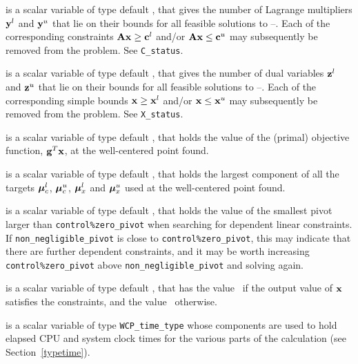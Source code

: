 \documentclass{galahad}
\newcommand{\packagename}{WCP}
\begin{document}
\begin{description}
 is a scalar variable of type default \integer, that gives the
number of Lagrange multipliers ${\mathbf{y}}^l$ and ${\mathbf{y}}^u$ that lie on their bounds 
for all feasible solutions to --. Each of the
corresponding constraints ${\mathbf{A}} {\mathbf{x}} \geq {\mathbf{c}}^l$ and/or 
${\mathbf{A}} {\mathbf{x}} \leq {\mathbf{c}}^u$ may subsequently be removed from the problem.
See {\tt C\_status}.

 is a scalar variable of type default \integer, that gives the
number of dual variables ${\mathbf{z}}^l$ and ${\mathbf{z}}^u$ that lie on their bounds 
for all feasible solutions to --. Each of the
corresponding simple bounds ${\mathbf{x}} \geq {\mathbf{x}}^l$ and/or 
${\mathbf{x}} \leq {\mathbf{x}}^u$ may subsequently be removed from the problem.
See {\tt X\_status}.

 is a scalar variable of type default \realdp, that holds the
value of the (primal) objective function, ${\mathbf{g}}^T {\mathbf{x}}$, 
at the well-centered point found.

 is a scalar variable of type default \realdp, 
that holds the largest component of all the targets
$\bm \mu_c^{l}$, $\bm \mu_c^{u}$, $\bm \mu_x^{l}$ and $\bm \mu_x^{u}$ used
at the well-centered point found.

 is a scalar variable of type default \realdp, 
that holds the value of the smallest pivot larger than 
{\tt control\%zero\_pivot}
when searching for dependent linear constraints. If 
{\tt non\_negligible\_pivot} is close to  {\tt control\%zero\_pivot},
this may indicate that there are further dependent constraints, and
it may be worth increasing {\tt control\%zero\_pivot} above 
{\tt non\_negligible\_pivot} and solving again.

 is a scalar variable of type default \logical, that has the
value \true\ if the output value of ${\mathbf{x}}$ satisfies the constraints,
and the value \false\ otherwise.

 is a scalar variable of type {\tt \packagename\_time\_type} 
whose components are used to hold elapsed CPU and system clock times for 
the various parts of the calculation (see Section~\ref{typetime}).


\end{description}
\end{document}
